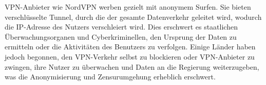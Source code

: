\gls{VPN}-Anbieter wie NordVPN werben gezielt mit anonymem Surfen. Sie bieten verschlüsselte Tunnel, durch die der gesamte Datenverkehr geleitet wird, wodurch die \gls{IP}-Adresse des Nutzers verschleiert wird. Dies erschwert es staatlichen Überwachungsorganen und Cyberkriminellen, den Ursprung der Daten zu ermitteln oder die Aktivitäten des Benutzers zu verfolgen. Einige Länder haben jedoch begonnen, den \gls{VPN}-Verkehr selbst zu blockieren oder \gls{VPN}-Anbieter zu zwingen, ihre Nutzer zu überwachen und Daten an die Regierung weiterzugeben, was die Anonymisierung und Zensurumgehung erheblich erschwert. \cite{6128478, NordVPN_Was_ist_eine_VPN}